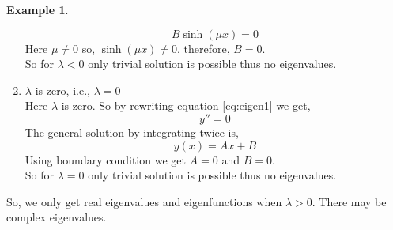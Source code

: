 \documentclass[12pt,a4paper]{article}
\theoremstyle{remark}
\theoremstyle{definition}
\newtheorem{ex}{Example}[section]
\begin{document}
\begin{ex}
\begin{enumerate}[label={Case \arabic*:}]
              \[
                  B\sinh(\mu x)=0
              \]
              Here $ \mu\neq0 $ so, $ \sinh(\mu x)\neq 0 $, therefore, $ B=0 $.\\
              So for $ \lambda<0 $ only trivial solution is possible thus no eigenvalues.
        \item \underline{$ \lambda $ is zero, i.e., $ \lambda =0 $}\\
              Here $ \lambda $ is zero. So by rewriting equation \eqref{eq:eigen1} we get,
              \[
                  y''=0
              \]
              The general solution by integrating twice is,
              \[
                  y(x)=Ax+B
              \]
              Using boundary condition we get $ A=0 $ and $ B=0 $.\\
              So for $ \lambda=0 $ only trivial solution is possible thus no eigenvalues.
    \end{enumerate}
    So, we only get real eigenvalues and eigenfunctions when $ \lambda>0 $. There may be complex eigenvalues.
\end{ex}
\end{document}
